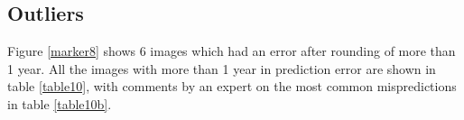 \documentclass[10pt,letterpaper]{article}
\begin{document}


\subsection*{Outliers}

Figure \ref{marker8} shows 6 images which had an error after rounding of more than 1 year. All the images with more than 1 year in prediction error are shown in table \ref{table10}, with comments by an expert on the most
common mispredictions in table \ref{table10b}. 
\end{document}
